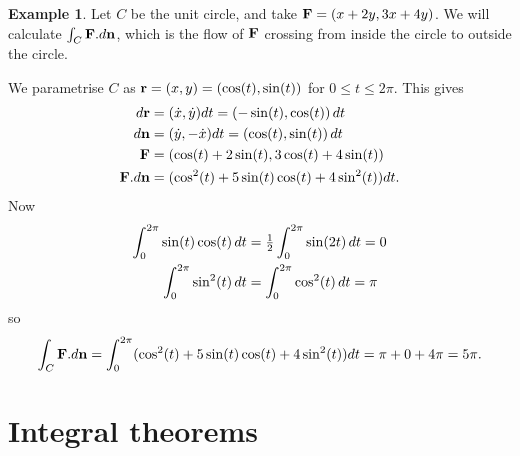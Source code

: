 \documentclass[reqno]{amsart}
\theoremstyle{definition}
\newtheorem{example}[theorem]{Example}
\begin{document}
\begin{example}
 Let $C$ be the unit circle, and take $\mathbf{F}=(x+2y,3x+4y)$.  We will
 calculate $\int_C\mathbf{F}.d\mathbf{n}$, which is the flow of $\mathbf{F}$ crossing from
 inside the circle to outside the circle.
  \begin{center}
  \end{center}
  We parametrise $C$ as 
  $\mathbf{r}=(x,y)=(\cos(t),\sin(t))$ for $0\leq t\leq 2\pi$.  This gives
  \begin{align*} 
   d\mathbf{r} &=(\dot{x},\dot{y})dt=(-\sin(t),\cos(t))\,dt \\
   d\mathbf{n} &=(\dot{y},-\dot{x})dt=(\cos(t),\sin(t))\,dt \\
   \mathbf{F}  &=(\cos(t)+2\sin(t),3\cos(t)+4\sin(t)) \\
   \mathbf{F}.d\mathbf{n} &=(\cos^2(t)+5\sin(t)\cos(t)+4\sin^2(t))dt.
  \end{align*}
  Now \vspace{-3ex}
  \begin{align*}
   \int_0^{2\pi}\sin(t)\cos(t)\,dt &=\tfrac{1}{2}\int_0^{2\pi}\sin(2t)\,dt=0 \\
   \int_0^{2\pi}\sin^2(t)\,dt &=\int_0^{2\pi}\cos^2(t)\,dt=\pi 
  \end{align*}
  so
  \[ \int_C\mathbf{F}.d\mathbf{n}=\int_0^{2\pi}(\cos^2(t)+5\sin(t)\cos(t)+4\sin^2(t))dt
     =\pi+0+4\pi=5\pi.
  \]
\end{example}

\section{Integral theorems}
\end{document}
